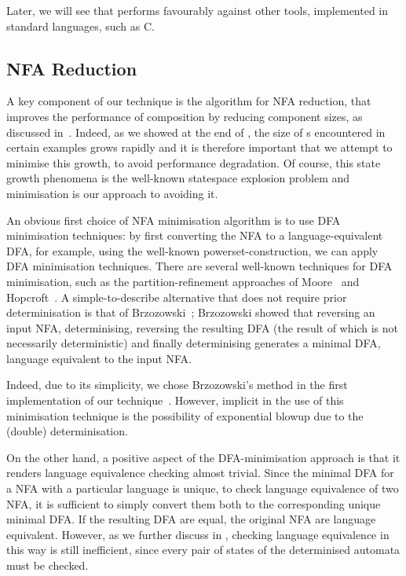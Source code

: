 Later, we will see that \penrose{} performs favourably against other tools,
implemented in standard languages, such as C.

\subsection{NFA Reduction}\label{sec:nfaReduction}

A key component of our technique is the algorithm for NFA reduction, that
improves the performance of \TNFA{} composition by reducing component \TNFA{}
sizes, as discussed in~. Indeed, as we showed at
the end of , the size of \TNFA{}s encountered in
certain examples grows rapidly and it is therefore important that we attempt to
minimise this growth, to avoid performance degradation. Of course, this state
growth phenomena is the well-known statespace explosion problem and
minimisation is our approach to avoiding it.

An obvious first choice of NFA minimisation algorithm is to use DFA
minimisation techniques: by first converting the NFA to a language-equivalent
DFA, for example, using the well-known powerset-construction, we can apply DFA
minimisation techniques. There are several well-known techniques for DFA
minimisation, such as the partition-refinement approaches of
Moore~\cite{Moore1956} and Hopcroft~\cite{Hopcroft1971}. A simple-to-describe
alternative that does not require prior determinisation is that of
Brzozowski~\cite{Brzozowski1962}; Brzozowski showed that reversing an input
NFA, determinising, reversing the resulting DFA (the result of which is not
necessarily deterministic) and finally determinising generates a minimal DFA,
language equivalent to the input NFA.

Indeed, due to its simplicity, we chose Brzozowski's method in the first
implementation of our technique~\cite{Sobocinski2013}. However, implicit in the
use of this minimisation technique is the possibility of exponential blowup due
to the (double) determinisation.

On the other hand, a positive aspect of the DFA-minimisation approach is that
it renders language equivalence checking almost trivial. Since the minimal DFA
for a NFA with a particular language is unique, to check language equivalence
of two NFA, it is sufficient to simply convert them both to the corresponding
unique minimal DFA. If the resulting DFA are equal, the original NFA are
language equivalent. However, as we further discuss in
, checking language equivalence in this way is
still inefficient, since every pair of states of the determinised automata must
be checked.

